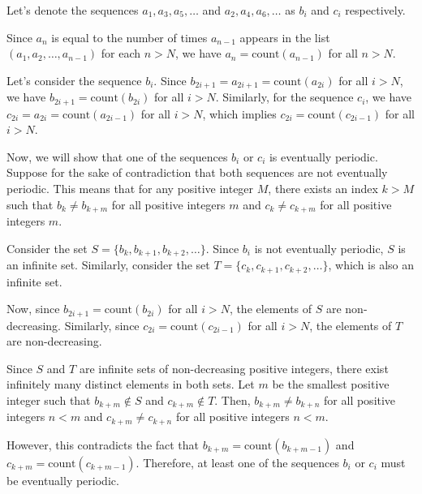 Let's denote the sequences $a_1, a_3, a_5, \ldots$ and $a_2, a_4, a_6, \ldots$ as $b_i$ and $c_i$ respectively.

Since $a_n$ is equal to the number of times $a_{n-1}$ appears in the list $(a_1, a_2, \ldots, a_{n-1})$ for each $n > N$, we have $a_n = \text{count}(a_{n-1})$ for all $n > N$.

Let's consider the sequence $b_i$. Since $b_{2i+1} = a_{2i+1} = \text{count}(a_{2i})$ for all $i > N$, we have $b_{2i+1} = \text{count}(b_{2i})$ for all $i > N$. Similarly, for the sequence $c_i$, we have $c_{2i} = a_{2i} = \text{count}(a_{2i-1})$ for all $i > N$, which implies $c_{2i} = \text{count}(c_{2i-1})$ for all $i > N$.

Now, we will show that one of the sequences $b_i$ or $c_i$ is eventually periodic. Suppose for the sake of contradiction that both sequences are not eventually periodic. This means that for any positive integer $M$, there exists an index $k > M$ such that $b_k \neq b_{k+m}$ for all positive integers $m$ and $c_k \neq c_{k+m}$ for all positive integers $m$.

Consider the set $S = \{b_k, b_{k+1}, b_{k+2}, \ldots\}$. Since $b_i$ is not eventually periodic, $S$ is an infinite set. Similarly, consider the set $T = \{c_k, c_{k+1}, c_{k+2}, \ldots\}$, which is also an infinite set.

Now, since $b_{2i+1} = \text{count}(b_{2i})$ for all $i > N$, the elements of $S$ are non-decreasing. Similarly, since $c_{2i} = \text{count}(c_{2i-1})$ for all $i > N$, the elements of $T$ are non-decreasing.

Since $S$ and $T$ are infinite sets of non-decreasing positive integers, there exist infinitely many distinct elements in both sets. Let $m$ be the smallest positive integer such that $b_{k+m} \notin S$ and $c_{k+m} \notin T$. Then, $b_{k+m} \neq b_{k+n}$ for all positive integers $n < m$ and $c_{k+m} \neq c_{k+n}$ for all positive integers $n < m$.

However, this contradicts the fact that $b_{k+m} = \text{count}(b_{k+m-1})$ and $c_{k+m} = \text{count}(c_{k+m-1})$. Therefore, at least one of the sequences $b_i$ or $c_i$ must be eventually periodic.
